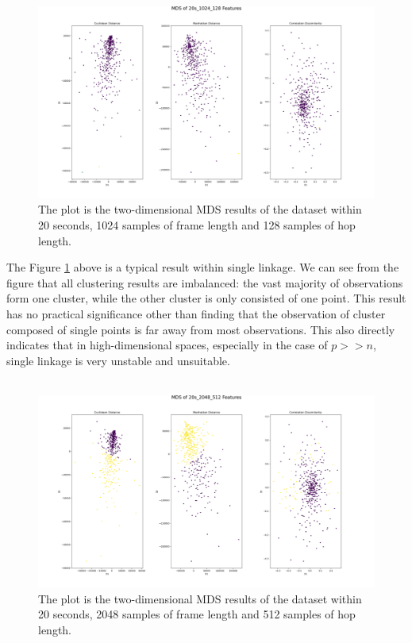 \\
\begin{figure}[h!]
	\centering
	\includegraphics[width=0.9\linewidth]{../Statistical_Sciences_template/figure/MDS of 20s_1024_128 Features Using Single Linkage.png}
	\caption{The plot is the two-dimensional MDS results of the dataset within 20 seconds, 1024 samples of frame length and 128 samples of hop length.}
	\label{fig:MDS of 20s_1024_256 Features Using Single Linkage}
\end{figure}
\noindent The Figure \ref{fig:MDS of 20s_1024_256 Features Using Single Linkage} above is a typical result within single linkage. We can see from the figure that all clustering results are imbalanced: the vast majority of observations form one cluster, while the other cluster is only consisted of one point. This result has no practical significance other than finding that the observation of cluster composed of single points is far away from most observations. This also directly indicates that in high-dimensional spaces, especially in the case of $p>>n$, single linkage is very unstable and unsuitable.\\
\\
\begin{figure}[h!]
	\centering
	\includegraphics[width=0.9\linewidth]{../Statistical_Sciences_template/figure/MDS of 20s_2048_512 Features Using PAM.png}
	\caption{The plot is the two-dimensional MDS results of the dataset within 20 seconds, 2048 samples of frame length and 512 samples of hop length.}
	\label{fig:MDS of 20s_1024_256 Features Using PAM}
\end{figure}
